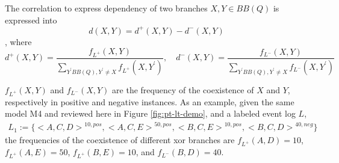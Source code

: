 \begin{definition} The correlation to express dependency of two branches $X,Y \in BB(Q)$ is expressed into
	\[d(X,Y)=  d^{+}(X, Y) -d^{-}(X, Y)\], where 
	\[d^{+}(X, Y)= \frac{f_{L^+}(X, Y)}{\sum_{Y^\prime BB(Q), Y^\prime \neq X} f_{L^+}(X, Y^\prime)}, \quad d^{-}(X, Y)= \frac{f_{L^-}(X, Y)}{\sum_{Y^\prime BB(Q), Y^\prime \neq X} f_{L^-}(X, Y^\prime)}\]	
\end{definition}
$f_{L^+}(X, Y) $ and $f_{L^-}(X, Y)$ are the frequency of the coexistence of $X$ and $Y$, respectively in positive and negative instances. As an example, given the same model M4 and reviewed here in Figure \ref{fig:pt-lt-demo}, and a labeled event log $L$,
\begin{align*}
L_1:= \{  {<A,C,D>}^{10, pos}, {<A,C,E>}^{50,pos}, {<B,C,E>}^{10,pos}, {<B,C,D>}^{40, neg}\}
\end{align*}
the frequencies of the coexistence of different xor branches are
$f_{L^+}(A, D)=10$, $f_{L^+}(A, E)=50$, $f_{L^+}(B, E)=10$, and $f_{L^-}(B, D)=40$. 
